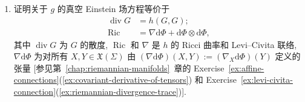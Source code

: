 \begin{RiemannExercise}
\begin{enumerate}[label=(\arabic*),ref=\arabic*,leftmargin=*]
\begin{enumerate}[label=(\alph*),leftmargin=*]
(\textbf{提示}: 利用第~\ref{chap:geometric-mechanics}~章的 Lemma~\ref{lem:levi-civita-under-conformal-change}.)
\item 证明关于 $g$ 的真空 Einstein 场方程等价于
\begin{align*}
  \operatorname{div}G&=h(G,G);\\
  \operatorname{Ric}&=\nabla\mathrm{d}\Phi+\mathrm{d}\Phi\otimes\mathrm{d}\Phi,
\end{align*}
其中 $\operatorname{div}G$ 为 $G$ 的散度, $\operatorname{Ric}$ 和 $\nabla$ 是 $h$ 的 Ricci 曲率和 Levi–Civita 联络, $\nabla\mathrm{d}\Phi$ 为对所有 $X,Y\in\mathfrak{X}(\Sigma)$ 由 $(\nabla\mathrm{d}\Phi)(X,Y):=(\nabla_X\mathrm{d}\Phi)(Y)$ 定义的张量 [参见第~\ref{chap:riemannian-manifolds}~章的 Exercise~\ref{ex:affine-connections}(\ref{ex:covariant-derivative-of-tensors}) 和 Exercise~\ref{ex:levi-civita-connection}(\ref{ex:riemannian-divergence-trace})].
\end{enumerate}
\end{enumerate}
\end{RiemannExercise}
